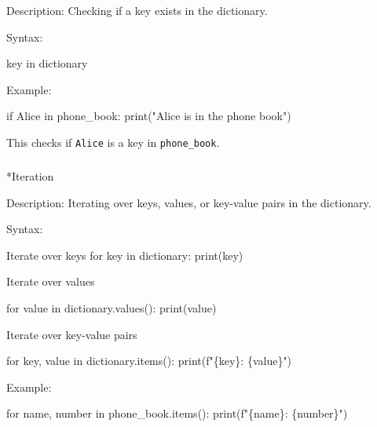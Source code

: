 \documentclass[
  letterpaper,
  DIV=11,
  numbers=noendperiod]{scrreprt}
\makeatletter
\let\oldsubparagraph\subparagraph
\renewcommand{\subparagraph}{
    \@ifstar
      \xxxSubParagraphStar
      \xxxSubParagraphNoStar
  }
\newcommand{\xxxSubParagraphStar}[1]{\oldsubparagraph*{#1}\mbox{}}
\newcommand{\xxxSubParagraphNoStar}[1]{\oldsubparagraph{#1}\mbox{}}
\newenvironment{Shaded}{\begin{snugshade}}{\end{snugshade}}
\newcommand{\NormalTok}[1]{\textcolor[rgb]{0.00,0.23,0.31}{#1}}
\makeatother
\begin{document}
Description: Checking if a key exists in the dictionary.

Syntax:

\begin{Shaded}
\begin{Highlighting}[]
\NormalTok{key in dictionary}
\end{Highlighting}
\end{Shaded}

Example:

\begin{Shaded}
\begin{Highlighting}[]
\NormalTok{if \textquotesingle{}Alice\textquotesingle{} in phone\_book:}
\NormalTok{    print("Alice is in the phone book")}
\end{Highlighting}
\end{Shaded}

This checks if \texttt{\textquotesingle{}Alice\textquotesingle{}} is a
key in \texttt{phone\_book}.

\subparagraph*{Iteration}\label{iteration}

Description: Iterating over keys, values, or key-value pairs in the
dictionary.

Syntax:

\begin{Shaded}
\begin{Highlighting}[]
\NormalTok{Iterate over keys}
\NormalTok{for key in dictionary:}
\NormalTok{    print(key)}
\end{Highlighting}
\end{Shaded}

Iterate over values

\begin{Shaded}
\begin{Highlighting}[]
\NormalTok{for value in dictionary.values():}
\NormalTok{    print(value)}
\end{Highlighting}
\end{Shaded}

Iterate over key-value pairs

\begin{Shaded}
\begin{Highlighting}[]
\NormalTok{for key, value in dictionary.items():}
\NormalTok{    print(f"\{key\}: \{value\}")}
\end{Highlighting}
\end{Shaded}

Example:

\begin{Shaded}
\begin{Highlighting}[]
\NormalTok{for name, number in phone\_book.items():}
\NormalTok{    print(f"\{name\}: \{number\}")}
\end{Highlighting}
\end{Shaded}
\end{document}
